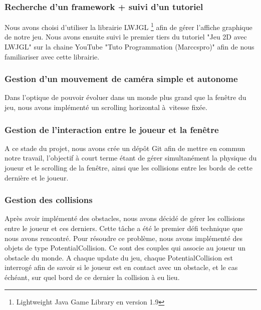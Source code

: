 
\subsubsection{Recherche d'un framework + suivi d'un tutoriel}
Nous avons choisi d'utiliser la librairie LWJGL \footnote{Lightweight Java Game Library en version 1.9} afin de gérer l'affiche graphique de notre jeu. Nous avons ensuite suivi le premier tiers du tutoriel "Jeu 2D avec LWJGL" sur la chaine YouTube "Tuto Programmation (Marccspro)" afin de nous familiariser avec cette librairie.

\subsubsection{Gestion d'un mouvement de caméra simple et autonome}
Dans l'optique de pouvoir évoluer dans un monde plus grand que la fenêtre du jeu, nous avons implémenté un scrolling horizontal à vitesse fixée.

\subsubsection{Gestion de l'interaction entre le joueur et la fenêtre}

A ce stade du projet, nous avons crée un dépôt Git afin de mettre en commun notre travail, l'objectif à court terme étant de gérer simultanément la physique du joueur et le scrolling de la fenêtre, ainsi que les collisions entre les bords de cette dernière et le joueur.

\subsubsection{Gestion des collisions}
Après avoir implémenté des obstacles, nous avons décidé de gérer les collisions entre le joueur et ces derniers. Cette tâche a été le premier défi technique que nous avons rencontré.
\ml
Pour résoudre ce problème, nous avons implémenté des objets de type PotentialCollision.
Ce sont des couples qui associe au joueur un obstacle du monde. A chaque update du jeu, chaque PotentialCollision est interrogé afin de savoir si le joueur est en contact avec un obstacle, et le cas échéant, sur quel bord de ce dernier la collision à eu lieu.


